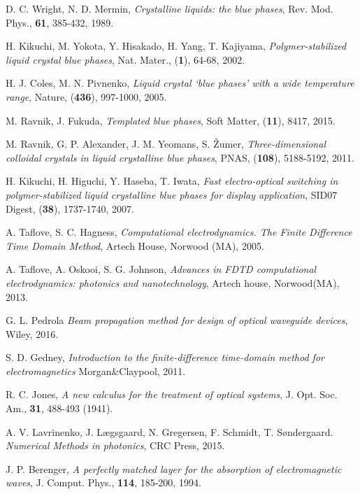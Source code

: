 \documentclass[longbibliography,slovene,a4paper,12pt]{book}
\begin{document}
\begin{thebibliography}{15}
	D. C. Wright, N. D. Mermin,
	\emph{Crystalline liquids: the blue phases},
	Rev. Mod. Phys., \textbf{61}, 385-432, 1989.

	H. Kikuchi, M. Yokota, Y. Hisakado, H. Yang, T. Kajiyama,
	\emph{Polymer-stabilized liquid crystal blue phases}, 
	Nat. Mater., (\textbf{1}), 64-68, 2002.

	H. J. Coles, M. N. Pivnenko,
	\emph{Liquid crystal `blue phases' with a wide temperature range}, 
	Nature, (\textbf{436}), 997-1000, 2005.

	M. Ravnik, J. Fukuda,
	\emph{Templated blue phases},
	Soft Matter, (\textbf{11}), 8417, 2015.
	
	M. Ravnik, G. P. Alexander, J. M. Yeomans, S. Žumer,
	\emph{Three-dimensional colloidal crystals in liquid crystalline blue phases},
	PNAS, (\textbf{108}), 5188-5192, 2011.
	
	H. Kikuchi, H. Higuchi, Y. Haseba, T. Iwata,
	\emph{Fast electro-optical switching in polymer-stabilized liquid crystalline blue phases for display application},
	SID07 Digest, (\textbf{38}), 1737-1740, 2007.
	

	A. Taflove, S. C. Hagness,
	\emph{Computational electrodynamics. The Finite Difference Time Domain Method},
	Artech House, Norwood (MA), 2005.
	
	A. Taflove, A. Oskooi, S. G. Johnson,
	\emph{Advances in FDTD computational electrodynamics: photonics and nanotechnology},
	Artech house, Norwood(MA), 2013.
	
	G. L. Pedrola
	\emph{Beam propagation method for design of optical waveguide devices},
	Wiley, 2016.	

	S. D. Gedney,
	\emph{Introduction to the finite-difference time-domain method for electromagnetics}
	Morgan\&Claypool, 2011.
	
	R. C. Jones,
	\emph{A new calculus for the treatment of optical systems},
	J. Opt. Soc. Am., \textbf{31}, 488-493 (1941).

	A. V. Lavrinenko, J. Lægsgaard, N. Gregersen, F. Schmidt, T. Søndergaard.
	\emph{Numerical Methods in photonics},
	CRC Press, 2015.

	 J. P. Berenger, \emph{A perfectly matched layer for the absorption of electromagnetic waves},
	 J. Comput. Phys., \textbf{114}, 185-200, 1994.
	 

\end{thebibliography}
\end{document}
